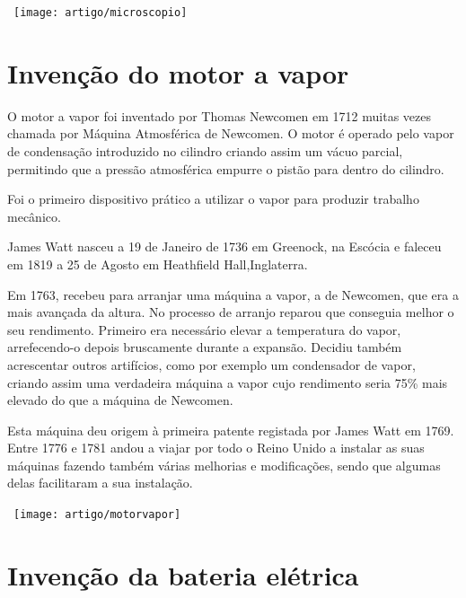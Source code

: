 \documentclass{report}
\begin{document}
\begin{center}
\ \texttt{[image: artigo/microscopio]}
\end{center}
 \begin{figure}[h]
 	\centerline{}
 \end{figure}
 
 
 

\chapter{Invenção do motor a vapor}
\label{chap.analise}
O motor a vapor foi inventado por Thomas Newcomen em 1712 muitas vezes chamada por Máquina Atmosférica de Newcomen. O motor é operado pelo vapor de condensação introduzido no cilindro criando assim um vácuo parcial, permitindo que a pressão atmosférica empurre o pistão para dentro do cilindro.

Foi o primeiro dispositivo prático a utilizar o vapor para produzir trabalho mecânico. 

James Watt nasceu a 19 de Janeiro de 1736 em Greenock, na Escócia e faleceu em 1819 a 25 de Agosto em Heathfield Hall,Inglaterra.

Em 1763, recebeu para arranjar uma máquina a vapor, a de Newcomen, que era a mais avançada da altura. No processo de arranjo reparou que conseguia melhor o seu rendimento. Primeiro era necessário elevar a temperatura do vapor, arrefecendo-o depois bruscamente durante a expansão. Decidiu também acrescentar outros artifícios, como por exemplo um condensador de vapor, criando assim uma verdadeira máquina a vapor cujo rendimento seria 75\% mais elevado do que a máquina de Newcomen.

Esta máquina deu origem à primeira patente registada por James Watt em 1769.
Entre 1776 e 1781 andou a viajar por todo o Reino Unido a instalar as suas máquinas fazendo também várias melhorias e modificações, sendo que algumas delas facilitaram a sua instalação. 

\begin{center}
\ \texttt{[image: artigo/motorvapor]}
\end{center}
 \begin{figure}[h]
 	\centerline{}
 \end{figure}


\chapter{Invenção da bateria elétrica}
\label{chap.conclusao}
\end{document}
